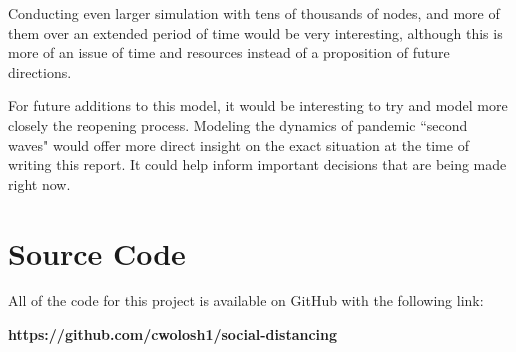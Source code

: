 \documentclass[12pt]{article}
\begin{document}
\begin{multicols}{2}
Conducting even larger simulation with tens of thousands of nodes, and more of them over an extended period of time would be very interesting, although this is more of an issue of time and resources instead of a proposition of future directions.

For future additions to this model, it would be interesting to try and model more closely the reopening process.
Modeling the dynamics of pandemic ``second waves" would offer more direct insight on the exact situation at the time of writing this report.
It could help inform important decisions that are being made right now.

\appendix

\section{Source Code}
All of the code for this project is available on GitHub with the following link:
\newline

\centering
\textbf{https://github.com/cwolosh1/social-distancing}



\end{multicols}
\end{document}
